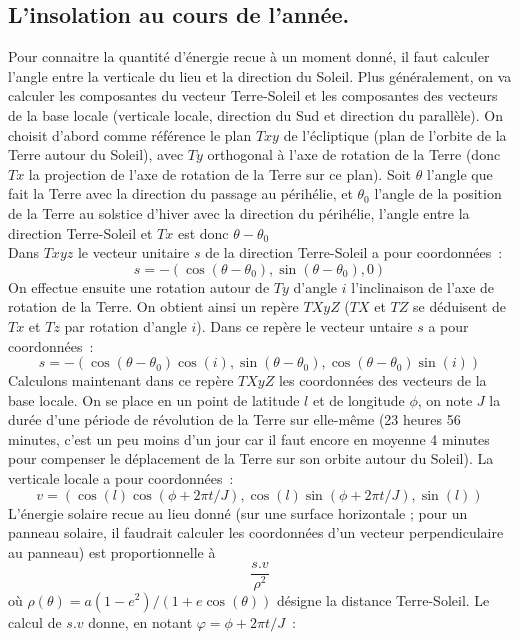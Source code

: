 \documentclass[a4paper,11pt]{article}
\begin{document}
\begin{giacjshere}
\subsection{L'insolation au cours de l'ann\'ee.} 
Pour connaitre la quantit\'e d'\'energie recue \`a un moment
donn\'e, il faut calculer l'angle entre la verticale du lieu
et la direction du Soleil. Plus g\'en\'eralement, on va calculer
les composantes du vecteur Terre-Soleil et les composantes
des vecteurs de la base locale (verticale locale, direction du Sud et
direction du parall\`ele). On choisit d'abord comme r\'ef\'erence
le plan $Txy$ de l'\'ecliptique (plan de l'orbite de la Terre
autour du Soleil), avec $Ty$ orthogonal \`a l'axe de rotation 
de la Terre (donc $Tx$ la projection de l'axe de rotation
de la Terre sur ce plan). Soit $\theta$ l'angle que fait la Terre
avec la direction du passage au p\'erih\'elie, et $\theta_0$
l'angle de la position de la Terre au solstice d'hiver avec la
direction du p\'erih\'elie, l'angle entre la direction Terre-Soleil
et $Tx$ est donc $\theta-\theta_0$\\
Dans $Txyz$ le vecteur unitaire $s$
de la direction Terre-Soleil a pour coordonn\'ees~:
\[ s=-(\cos(\theta-\theta_0),\sin(\theta-\theta_0),0)\]
On effectue ensuite une rotation autour
de $Ty$ d'angle $i$ l'inclinaison de l'axe de rotation de la Terre.
On obtient ainsi un rep\`ere $TXyZ$ ($TX$ et $TZ$ se déduisent de 
$Tx$ et $Tz$ par rotation d'angle $i$). Dans ce repère 
le vecteur untaire $s$ a pour coordonnées~:
\[ s=-(\cos(\theta-\theta_0)\cos(i),\sin(\theta-\theta_0),
\cos(\theta-\theta_0)\sin(i)) \]
Calculons maintenant dans ce rep\`ere $TXyZ$ les coordonn\'ees
des vecteurs de la base locale. On se place en un point de latitude
$l$ et de longitude $\phi$, on note $J$ la dur\'ee d'une p\'eriode
de r\'evolution de la Terre sur elle-m\^eme (23 heures 56 minutes,
c'est un peu moins d'un jour car il faut encore en moyenne 4 minutes
pour compenser le d\'eplacement de la Terre sur son orbite autour
du Soleil). La verticale locale a pour coordonn\'ees~:
\[ v=(\cos(l)\cos(\phi+2\pi t/J),\cos(l)\sin(\phi+2\pi t/J),\sin(l))
\]
L'\'energie solaire recue au lieu donn\'e (sur une surface horizontale ;
pour un panneau solaire, il faudrait calculer les coordonn\'ees d'un vecteur
perpendiculaire au panneau) est proportionnelle \`a
\[ \frac{s.v}{\rho^2} \]
o\`u $\rho(\theta)=a(1-e^2)/(1+e\cos(\theta))$ 
d\'esigne la distance Terre-Soleil.
Le calcul de $s.v$ donne, en notant $\varphi=\phi+2\pi t/J$~:

\end{giacjshere}
\end{document}
